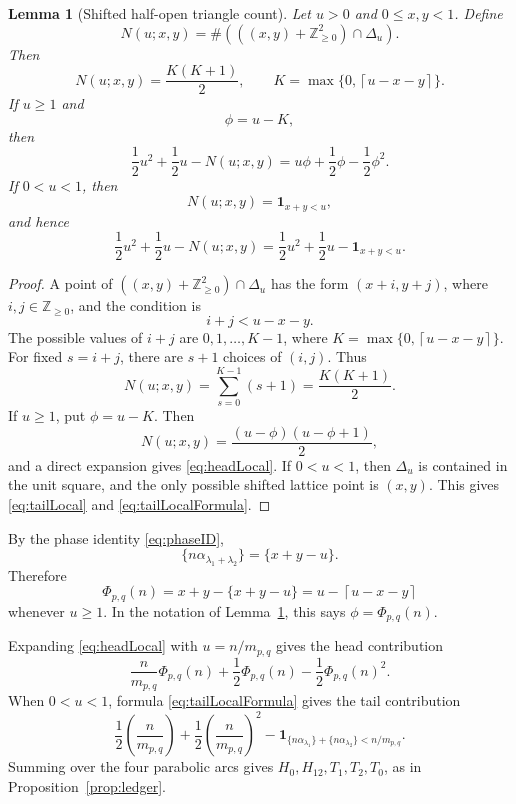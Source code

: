 \documentclass[a4paper,american,11pt]{amsart}
\theoremstyle{plain}
\newtheorem{lemma}[theorem]{Lemma}
\theoremstyle{definition}
\newcommand{\Z}{\mathbb Z}
\newcommand{\ind}{\mathbf 1}
\newcommand{\ceil}[1]{\left\lceil #1\right\rceil}
\begin{document}
\begin{lemma}[Shifted half-open triangle count]\label{lem:triCount}
Let \(u>0\) and \(0\le x,y<1\).  Define
\[
 N(u;x,y)=\#\left(((x,y)+\Z^2_{\ge0})\cap \Delta_u\right).
\]
Then
\begin{equation}\label{eq:NuK}
 N(u;x,y)=\frac{K(K+1)}2,
 \qquad
 K=\max\{0,\ceil{u-x-y}\}.
\end{equation}
If \(u\ge1\) and
\[
 \phi=u-K,
\]
then
\begin{equation}\label{eq:headLocal}
 \frac12u^2+\frac12u-N(u;x,y)
 =u\phi+\frac12\phi-\frac12\phi^2.
\end{equation}
If \(0<u<1\), then
\begin{equation}\label{eq:tailLocal}
 N(u;x,y)=\ind_{x+y<u},
\end{equation}
and hence
\begin{equation}\label{eq:tailLocalFormula}
 \frac12u^2+\frac12u-N(u;x,y)=\frac12u^2+\frac12u-\ind_{x+y<u}.
\end{equation}
\end{lemma}

\begin{proof}
A point of \(((x,y)+\Z^2_{\ge0})\cap\Delta_u\) has the form \((x+i,y+j)\),
where \(i,j\in\Z_{\ge0}\), and the condition is
\[
 i+j<u-x-y.
\]
The possible values of \(i+j\) are \(0,1,\ldots,K-1\), where
\(K=\max\{0,\ceil{u-x-y}\}\).  For fixed \(s=i+j\), there are \(s+1\) choices
of \((i,j)\).  Thus
\[
 N(u;x,y)=\sum_{s=0}^{K-1}(s+1)=\frac{K(K+1)}2.
\]
If \(u\ge1\), put \(\phi=u-K\).  Then
\[
 N(u;x,y)=\frac{(u-\phi)(u-\phi+1)}2,
\]
and a direct expansion gives \eqref{eq:headLocal}.  If \(0<u<1\), then
\(\Delta_u\) is contained in the unit square, and the only possible shifted
lattice point is \((x,y)\).  This gives \eqref{eq:tailLocal} and
\eqref{eq:tailLocalFormula}.
\end{proof}

By the phase identity \eqref{eq:phaseID},
\[
 \{n\alpha_{\lambda_1+\lambda_2}\}=\{x+y-u\}.
\]
Therefore
\begin{equation}\label{eq:phiXYU}
 \Phi_{p,q}(n)=x+y-\{x+y-u\}=u-\ceil{u-x-y}
\end{equation}
whenever \(u\ge1\).  In the notation of Lemma~\ref{lem:triCount}, this says
\(\phi=\Phi_{p,q}(n)\).

Expanding \eqref{eq:headLocal} with \(u=n/m_{p,q}\) gives the head
contribution
\[
 \frac{n}{m_{p,q}}\Phi_{p,q}(n)
 +\frac12\Phi_{p,q}(n)
 -\frac12\Phi_{p,q}(n)^2.
\]
When \(0<u<1\), formula \eqref{eq:tailLocalFormula} gives the tail
contribution
\[
 \frac12\left(\frac{n}{m_{p,q}}\right)
 +\frac12\left(\frac{n}{m_{p,q}}\right)^2
 -\ind_{\{n\alpha_{\lambda_1}\}+\{n\alpha_{\lambda_2}\}<n/m_{p,q}}.
\]
Summing over the four parabolic arcs gives \(H_0,H_{12},T_1,T_2,T_0\), as in
Proposition~\ref{prop:ledger}.
\end{document}
